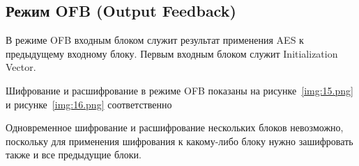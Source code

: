 \subsection{Режим OFB (Output Feedback)}

В режиме OFB входным блоком служит результат применения AES к предыдущему входному блоку. Первым входным блоком служит Initialization Vector.


Шифрование и расшифрование в режиме OFB показаны на рисунке~\ref{img:15.png}
и рисунке~\ref{img:16.png} соответственно


Одновременное шифрование и расшифрование нескольких блоков невозможно, поскольку для применения шифрования к какому-либо блоку нужно зашифровать также и все предыдущие блоки.

\newpage
